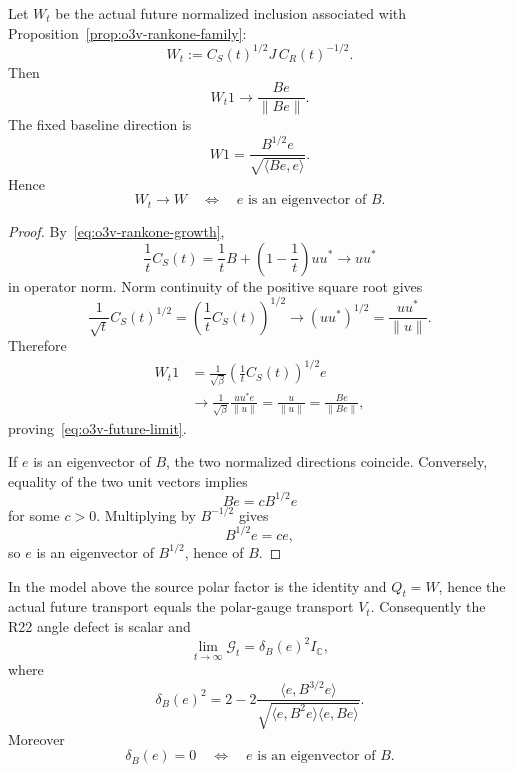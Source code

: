 \begin{theorem}
\label{thm:o3v-polar-drift}
Let \(W_t\) be the actual future normalized inclusion associated with
Proposition~\ref{prop:o3v-rankone-family}:
\[
 W_t
 :=C_S(t)^{1/2}J\,C_R(t)^{-1/2}.
\]
Then
\[
 \boxed{
 W_t1
 \longrightarrow
 \frac{Be}{\|Be\|}.
 }
\tag{O3V.6}\label{eq:o3v-future-limit}
\]
The fixed baseline direction is
\[
 W1=\frac{B^{1/2}e}{\sqrt{\langle Be,e\rangle}}.
\]
Hence
\[
 \boxed{
 W_t\longrightarrow W
 \quad\Longleftrightarrow\quad
 e\text{ is an eigenvector of }B.
 }
\tag{O3V.7}\label{eq:o3v-alignment-criterion}
\]
\end{theorem}

\begin{proof}
By~\eqref{eq:o3v-rankone-growth},
\[
 \frac1tC_S(t)
 =\frac1tB+\left(1-\frac1t\right)uu^*
 \longrightarrow uu^*
\]
in operator norm.  Norm continuity of the positive square root gives
\[
 \frac1{\sqrt t}C_S(t)^{1/2}
 =\left(\frac1tC_S(t)\right)^{1/2}
 \longrightarrow(uu^*)^{1/2}
 =\frac{uu^*}{\|u\|}.
\]
Therefore
\[
\begin{aligned}
 W_t1
 &=\frac1{\sqrt\beta}
   \left(\frac1tC_S(t)\right)^{1/2}e\\
 &\longrightarrow
 \frac1{\sqrt\beta}\frac{uu^*e}{\|u\|}
 =\frac{u}{\|u\|}
 =\frac{Be}{\|Be\|},
\end{aligned}
\]
proving~\eqref{eq:o3v-future-limit}.

If \(e\) is an eigenvector of \(B\), the two normalized directions coincide.
Conversely, equality of the two unit vectors implies
\[
 Be=cB^{1/2}e
\]
for some \(c>0\).  Multiplying by \(B^{-1/2}\) gives
\[
 B^{1/2}e=ce,
\]
so \(e\) is an eigenvector of \(B^{1/2}\), hence of \(B\).
\end{proof}

\begin{corollary}
\label{cor:o3v-angle-defect}
In the model above the source polar factor is the identity and
\(Q_t=W\), hence the actual future transport equals the polar-gauge transport
\(V_t\).  Consequently the R22 angle defect is scalar and
\[
 \boxed{
 \lim_{t\to\infty}\mathscr G_t
 =\delta_B(e)^2 I_{\mathbb C},
 }
\tag{O3V.8}\label{eq:o3v-G-limit}
\]
where
\[
 \boxed{
 \delta_B(e)^2
 =2-2\frac{\langle e,B^{3/2}e\rangle}
 {\sqrt{\langle e,B^2e\rangle\langle e,Be\rangle}}.
 }
\tag{O3V.9}\label{eq:o3v-half-full-angle}
\]
Moreover
\[
 \delta_B(e)=0
 \quad\Longleftrightarrow\quad
 e\text{ is an eigenvector of }B.
\]
\end{corollary}

